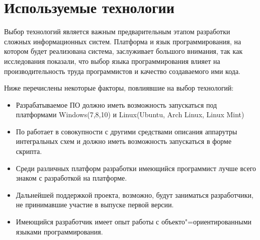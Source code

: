 \lstset{style=fsharpstyle}

\section{Используемые технологии}
\label{sec:practice:technology_used}

Выбор технологий является важным предварительным этапом разработки сложных информационных систем.
Платформа и язык программирования, на котором будет реализована система, заслуживает большого внимания, так как исследования показали, что выбор языка программирования влияет на производительность труда программистов и качество создаваемого ими кода.

Ниже перечислены некоторые факторы, повлиявшие на выбор технологий:
\begin{itemize}
\item Разрабатываемое ПО должно иметь возможность запускаться под платформами Windows(7,8,10) и Linux(Ubuntu, Arch Linux, Linux Mint)
\item По работает в совокупности с другими средствами описания аппарутры интегральных схем и должно иметь возможность запускаться в форме скрипта.
\item Среди различных платформ разработки имеющийся программист лучше всего знаком с разработкой на платформе.
\item Дальнейшей поддержкой проекта, возможно, будут заниматься разработчики, не принимавшие участие в выпуске первой версии.
\item Имеющийся разработчик имеет опыт работы с объекто"=ориентированными языками программирования.
\end{itemize}

